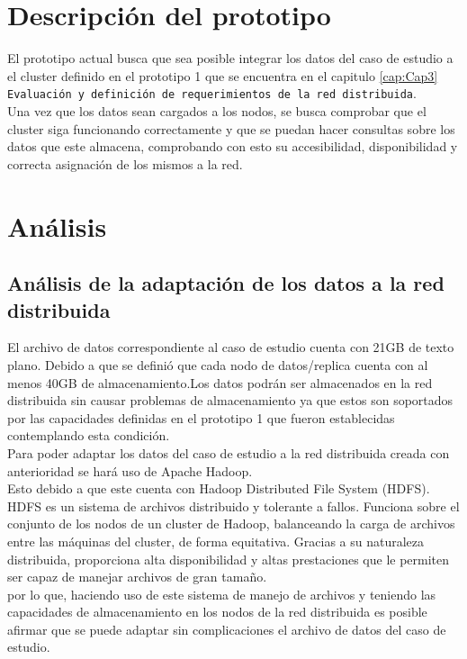 \section{Descripción del prototipo}
El prototipo actual busca que sea posible integrar los datos del caso de estudio a el cluster definido en el prototipo 1 que se encuentra en el capitulo \ref{cap:Cap3} \texttt{ Evaluación y definición de requerimientos de la red distribuida}.
\\
Una vez que los datos sean cargados a los nodos, se busca comprobar que el cluster siga funcionando correctamente y que se puedan hacer consultas sobre los datos que este almacena, comprobando con esto su accesibilidad, disponibilidad y correcta asignación de los mismos a la red.
\section{Análisis}
\subsection{Análisis de la adaptación de los datos a la red distribuida}
El archivo de datos correspondiente al caso de estudio cuenta con 21GB de texto plano. Debido a que se definió que cada nodo de datos/replica cuenta con al menos 40GB de almacenamiento.Los datos podrán ser almacenados en la red distribuida sin causar problemas de almacenamiento ya que estos son soportados por las capacidades definidas en el prototipo 1 que fueron establecidas contemplando esta condición.
\\
Para poder adaptar los datos del caso de estudio a la red distribuida creada con anterioridad se hará uso de Apache Hadoop. 
\\
Esto debido a que este cuenta con Hadoop Distributed File System (HDFS). HDFS  es  un  sistema  de  archivos  distribuido  y  tolerante  a  fallos. Funciona  sobre  el  
conjunto  de  los  nodos  de  un  cluster  de  Hadoop,  balanceando  la  carga  de  archivos   entre   las   máquinas   del   cluster,   de   forma   equitativa.   Gracias   a   su   
naturaleza  distribuida,  proporciona  alta  disponibilidad  y  altas  prestaciones  que  le  permiten ser capaz de manejar archivos de gran tamaño.
\\
por lo que, haciendo uso de este sistema de manejo de archivos y teniendo las capacidades de almacenamiento en los nodos de la red distribuida es posible afirmar que se puede adaptar sin complicaciones el archivo de datos del caso de estudio.

